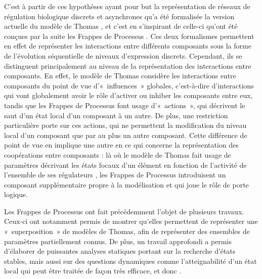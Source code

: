 C'est à partir de ces hypothèses
ayant pour but la représentation de réseaux de régulation biologique discrets et asynchrones
qu'a été formalisée
la version actuelle du modèle de Thomas \cite{Richard06},
et c'est en s'inspirant de celle-ci qu'ont été conçues par la suite
les Frappes de Processus \cite{PMR10-TCSB}.
Ces deux formalismes permettent en effet
de représenter les interactions entre différents composants
sous la forme de l'évolution séquentielle de niveaux d'expression discrets.
Cependant, ils se distinguent principalement au niveau de la représentation
des interactions entre composants.
En effet, le modèle de Thomas considère les interactions entre composants du point
de vue d'«~influences~» globales, c'est-à-dire d'interactions qui vont globalement avoir
le rôle d'activer ou inhiber les composants entre eux,
tandis que les Frappes de Processus font usage d'«~actions~»,
qui décrivent le saut d'un état local d'un composant à un autre.
De plus, une restriction particulière porte sur ces actions,
qui ne permettent la modification du niveau local d'un composant
que par au plus un autre composant.
Cette différence de point de vue en implique une autre en ce qui concerne la représentation
des coopérations entre composants :
là où le modèle de Thomas fait usage de paramètres décrivant
les états focaux d'un élément en fonction de l'activité de l'ensemble de ses régulateurs
\cite{Snoussi89},
les Frappes de Processus introduisent un composant supplémentaire propre à la modélisation
et qui joue le rôle de porte logique.

Les Frappes de Processus ont fait précédemment l'objet de plusieurs travaux.
Ceux-ci ont notamment permis de montrer qu'elles permettent de représenter une «~superposition~»
de modèles de Thomas, afin de représenter des ensembles de paramètres partiellement connus.
De plus, un travail approfondi a permis d'élaborer de puissantes analyses statiques
portant sur la recherche d'états stables,
mais aussi sur des questions dynamiques comme l'atteignabilité d'un état local \cite{PMR12-MSCS}
qui peut être traitée de façon très efficace, et donc .





